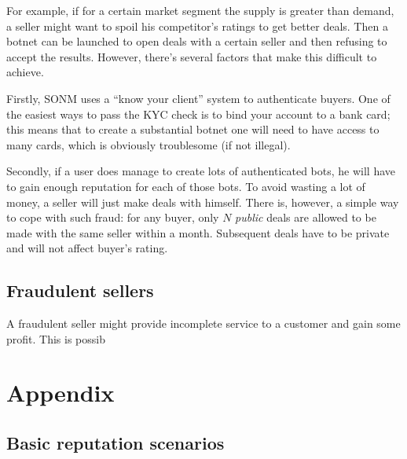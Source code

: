 \documentclass[11pt]{article}
\begin{document}
For example, if for a certain market segment the supply is greater than demand, a seller might want to spoil his competitor's ratings to get better deals. Then a botnet can be launched to open deals with a certain seller and then refusing to accept the results. However, there's several factors that make this difficult to achieve.

Firstly, SONM uses a ``know your client'' system to authenticate buyers. One of the easiest ways to pass the KYC check is to bind your account to a bank card; this means that to create a substantial botnet one will need to have access to many cards, which is obviously troublesome (if not illegal).

Secondly, if a user does manage to create lots of authenticated bots, he will have to gain enough reputation for each of those bots. To avoid wasting a lot of money, a seller will just make deals with himself. There is, however, a simple way to cope with such fraud: for any buyer, only $ N $ \textit{public} deals are allowed to be made with the same seller within a month. Subsequent deals have to be private and will not affect buyer's rating.

\subsection{Fraudulent sellers}

A fraudulent seller might provide incomplete service to a customer and gain some profit. This is possib

\newpage

\section{Appendix} \label{appendix}

\subsection{Basic reputation scenarios} \label{appendix:basicReputation}
\end{document}
